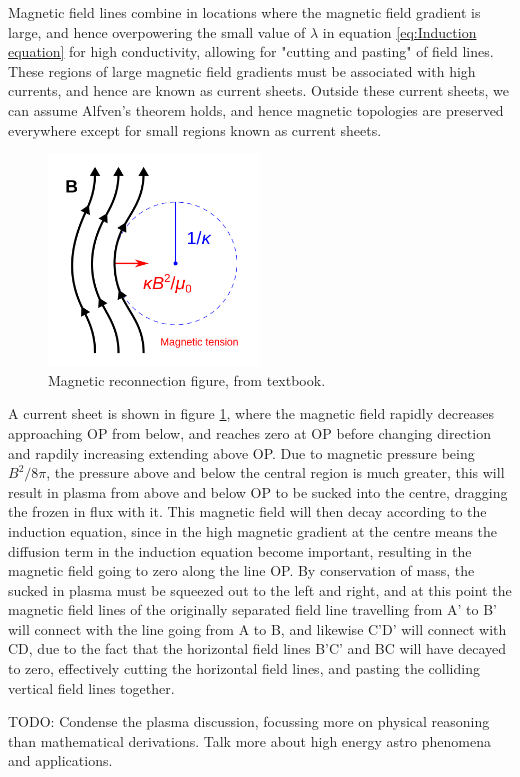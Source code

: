 Magnetic field lines combine in locations where the magnetic field gradient is large, and hence overpowering the small value of $\lambda$ in equation \ref{eq:Induction equation} for high conductivity, allowing for "cutting and pasting" of field lines. These regions of large magnetic field gradients must be associated with high currents, and hence are known as current sheets. Outside these current sheets, we can assume Alfven's theorem holds, and hence magnetic topologies are preserved everywhere except for small regions known as current sheets.

\begin{figure}
    \centering
    \includegraphics[width=0.5\textwidth]{preliminaries/preliminaries_images/Magnetic_tension_diagram.svg.png}
    \caption{Magnetic reconnection figure, from textbook.}
    \label{fig:Magnetic reconnection, from textbook}
\end{figure}

A current sheet is shown in figure \ref{fig:Magnetic reconnection, from textbook}, where the magnetic field rapidly decreases approaching OP from below, and reaches zero at OP before changing direction and rapdily increasing extending above OP. Due to magnetic pressure being $B^2 / 8\pi$, the pressure above and below the central region is much greater, this will result in plasma from above and below OP to be sucked into the centre, dragging the frozen in flux with it. This magnetic field will then decay according to the induction equation, since in the high magnetic gradient at the centre means the diffusion term in the induction equation become important, resulting in the magnetic field going to zero along the line OP. By conservation of mass, the sucked in plasma must be squeezed out to the left and right, and at this point the magnetic field lines of the originally separated field line travelling from A' to B' will connect with  the line going from  A to B, and likewise C'D' will connect with CD, due to the fact that the horizontal field lines B'C' and BC will have decayed to zero, effectively cutting the horizontal field lines, and pasting the colliding vertical field lines together.

TODO: Condense the plasma discussion, focussing more on physical reasoning than mathematical derivations. Talk more about high energy astro phenomena and applications.






% 